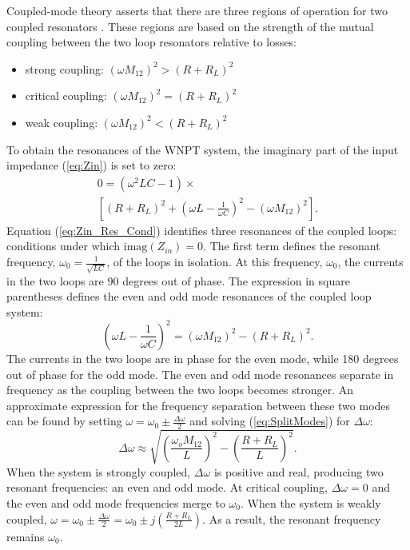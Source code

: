 \documentclass[journal]{IEEEtran}
\begin{document}
Coupled-mode theory asserts that there are three regions of operation for two coupled resonators \cite{Soljacic, Everitt}. These regions are based on the strength of the mutual coupling between the two loop resonators relative to losses:
\begin{itemize}
\item strong coupling: $\left(\omega M_{12}\right)^2 > \left(R+R_L\right)^2$
\item critical coupling: $\left(\omega M_{12}\right)^2 = \left(R+R_L\right)^2$
\item weak coupling: $\left(\omega M_{12}\right)^2 < \left(R+R_L\right)^2$
\end{itemize}
To obtain the resonances of the WNPT system, the imaginary part of the input impedance (\ref{eq:Zin}) is set to zero:
\begin{multline}
0=\left(\omega^2LC - 1\right) \times \\
\left[\left(R+R_L\right)^2 + \left(\omega L -\frac{1}{\omega C}\right)^2 - \left(\omega M_{12}\right)^2\right].
\label{eq:Zin_Res_Cond}
\end{multline}
Equation (\ref{eq:Zin_Res_Cond}) identifies three resonances of the coupled loops: conditions under which $\mathrm{imag}(Z_{in})=0$. The first term defines the resonant frequency, $\omega_0 = \frac{1}{\sqrt{LC}}$, of the loops in isolation. At this frequency, $\omega_0$, the currents in the two loops are 90 degrees out of phase. The expression in square parentheses defines the even and odd mode resonances of the coupled loop system:
\begin{equation}
\left(\omega L -\frac{1}{\omega C}\right)^2 =\left(\omega M_{12}\right)^2 - \left(R+R_L\right)^2.
\label{eq:SplitModes}
\end{equation}
The currents in the two loops are in phase for the even mode, while 180 degrees out of phase for the odd mode.  The even and odd mode resonances separate in frequency as the coupling between the two loops becomes stronger. An approximate expression for the frequency separation between these two modes can be found by setting $\omega = \omega_0 \pm \frac{\Delta \omega}{2}$ and solving (\ref{eq:SplitModes}) for $\Delta \omega$:
\begin{equation}
\Delta \omega \approx \sqrt{\left(\frac{{\omega}_o M_{12}}{L}\right)^2-\left(\frac{R+R_L}{L}\right)^2}.
\label{eq:Freq_Split}
\end{equation}
When the system is strongly coupled, $\Delta \omega$ is positive and real, producing two resonant frequencies: an even and odd mode. At critical coupling, $\Delta \omega =0$ and the even and odd mode frequencies merge to $\omega_0$. When the system is weakly coupled, $\omega =\omega_0 \pm \frac{\Delta \omega}{2}=\omega_0 \pm j\left(\frac{R+R_L}{2L}\right)$. As a result, the resonant frequency remains $\omega_0$.
\end{document}
